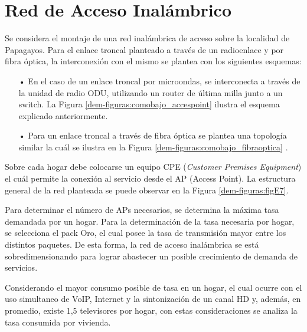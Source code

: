 \section{Red de Acceso Inalámbrico}
Se considera el montaje de una red inalámbrica de acceso sobre la localidad de Papagayos. Para el enlace troncal planteado a través de un radioenlace  y por fibra óptica, la interconexión con el mismo se plantea con los siguientes esquemas:
\begin{enumerate}
\item[•]En el caso de un enlace troncal por microondas, se interconecta a través de la unidad de radio ODU, utilizando un router de última milla junto a un switch. La Figura \ref{dem-figuras:comobajo_accespoint} ilustra el esquema explicado anteriormente.



\item[•]Para un enlace troncal a través de fibra óptica se plantea una topología similar la cuál se ilustra en la Figura \ref{dem-figuras:comobajo_fibraoptica} .




\end{enumerate}


Sobre cada hogar debe colocarse un equipo CPE (\textit{Customer Premises Equipment}) el cuál permite la conexión al servicio desde el AP (Access Point). La estructura general de la red planteada se puede observar en la Figura \ref{dem-figuras:figE7}.


Para determinar el número de APs necesarios, se determina la máxima tasa demandada por un hogar.
Para la determinación de la tasa necesaria por hogar, se selecciona el pack Oro, el cual posee la tasa de transmisión mayor entre los distintos paquetes. De esta forma, la red de acceso inalámbrica se está sobredimensionando para lograr abastecer un posible crecimiento de demanda de servicios.

Considerando el mayor consumo posible de tasa en un hogar, el cual ocurre con el uso simultaneo de VoIP, Internet y la sintonización de un canal HD y, además, en promedio, existe 1,5 televisores por hogar, con estas consideraciones se analiza  la tasa consumida por vivienda.

